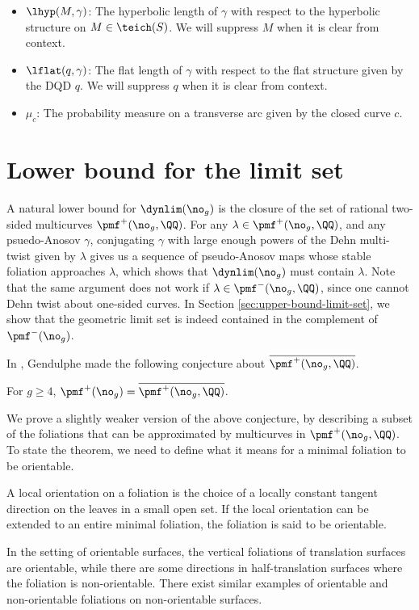 \documentclass[12pt, reqno]{amsart}
\begin{document}
\begin{itemize}
\item[] $\lhyp(M, \gamma)$: The hyperbolic length of $\gamma$ with respect to the hyperbolic structure on $M \in \teich(S)$. We will suppress $M$ when it is clear from context.
\item[] $\lflat(q, \gamma)$: The flat length of $\gamma$ with respect to the flat structure given by the DQD $q$. We will suppress $q$ when it is clear from context.
\item[] $\mu_{c}$: The probability measure on a transverse arc given by the closed curve $c$.
\end{itemize}

\section{Lower bound for the limit set}
\label{sec:lower-bound-limit-set}

A natural lower bound for $\dynlim(\no_g)$ is the closure of the set of rational two-sided multicurves $\pmf^+(\no_g, \QQ)$.
For any $\lambda \in \pmf^+(\no_g, \QQ)$, and any psuedo-Anosov $\gamma$, conjugating $\gamma$ with large enough powers of the Dehn multi-twist given by $\lambda$ gives us a sequence of pseudo-Anosov maps whose stable foliation approaches $\lambda$, which shows that $\dynlim(\no_g)$ must contain $\lambda$.
Note that the same argument does not work if $\lambda \in \pmf^-(\no_g, \QQ)$, since one cannot Dehn twist about one-sided curves.
In Section \ref{sec:upper-bound-limit-set}, we show that the geometric limit set is indeed contained in the complement of $\pmf^-(\no_g)$.

In \cite{gendulphe_whats_2017}, Gendulphe made the following conjecture about $\overline{\pmf^+(\no_g, \QQ)}$.
\begin{conjecture}
  \label{conj:gendulphe-1}
  For $g \geq 4$, $\pmf^+(\no_g) = \overline{\pmf^+(\no_g, \QQ)}$.
\end{conjecture}
We prove a slightly weaker version of the above conjecture, by describing a subset of the foliations that can be approximated by multicurves in $\pmf^+(\no_g, \QQ)$.
To state the theorem, we need to define what it means for a minimal foliation to be orientable.
\begin{definition}
  A local orientation on a foliation is the choice of a locally constant tangent direction on the leaves in a small open set.
  If the local orientation can be extended to an entire minimal foliation, the foliation is said to be orientable.
\end{definition}
In the setting of orientable surfaces, the vertical foliations of translation surfaces are orientable, while there are some directions in half-translation surfaces where the foliation is non-orientable.
There exist similar examples of orientable and non-orientable foliations on non-orientable surfaces.
\end{document}
